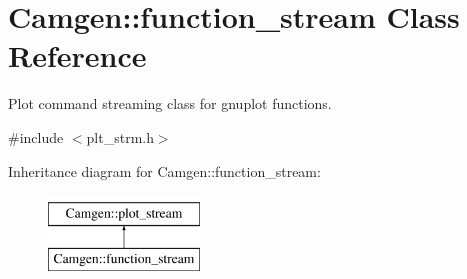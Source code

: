 \hypertarget{a00231}{\section{Camgen\-:\-:function\-\_\-stream Class Reference}
\label{a00231}
}


Plot command streaming class for gnuplot functions.  




{\ttfamily \#include $<$plt\-\_\-strm.\-h$>$}

Inheritance diagram for Camgen\-:\-:function\-\_\-stream\-:\begin{figure}[H]
\begin{center}
\leavevmode
\includegraphics[height=2.000000cm]{a00231}
\end{center}
\end{figure}
